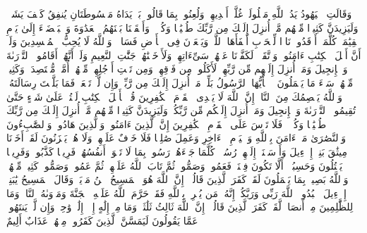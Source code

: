 وَقَالَتِ ٱلۡیَهُودُ یَدُ ٱللَّهِ مَغۡلُولَةٌۚ غُلَّتۡ أَیۡدِیهِمۡ وَلُعِنُوا۟ بِمَا قَالُوا۟ۘ بَلۡ یَدَاهُ مَبۡسُوطَتَانِ یُنفِقُ كَیۡفَ یَشَاۤءُۚ وَلَیَزِیدَنَّ كَثِیرࣰا مِّنۡهُم مَّاۤ أُنزِلَ إِلَیۡكَ مِن رَّبِّكَ طُغۡیَٰنࣰا وَكُفۡرࣰاۚ وَأَلۡقَیۡنَا بَیۡنَهُمُ ٱلۡعَدَٰوَةَ وَٱلۡبَغۡضَاۤءَ إِلَىٰ یَوۡمِ ٱلۡقِیَٰمَةِۚ كُلَّمَاۤ أَوۡقَدُوا۟ نَارࣰا لِّلۡحَرۡبِ أَطۡفَأَهَا ٱللَّهُۚ وَیَسۡعَوۡنَ فِی ٱلۡأَرۡضِ فَسَادࣰاۚ وَٱللَّهُ لَا یُحِبُّ ٱلۡمُفۡسِدِینَ%
\stopbuffer%
\startbuffer[\q:5:65]
وَلَوۡ أَنَّ أَهۡلَ ٱلۡكِتَٰبِ ءَامَنُوا۟ وَٱتَّقَوۡا۟ لَكَفَّرۡنَا عَنۡهُمۡ سَیِّءَاتِهِمۡ وَلَأَدۡخَلۡنَٰهُمۡ جَنَّٰتِ ٱلنَّعِیمِ%
\stopbuffer%
\startbuffer[\q:5:66]
وَلَوۡ أَنَّهُمۡ أَقَامُوا۟ ٱلتَّوۡرَىٰةَ وَٱلۡإِنجِیلَ وَمَاۤ أُنزِلَ إِلَیۡهِم مِّن رَّبِّهِمۡ لَأَكَلُوا۟ مِن فَوۡقِهِمۡ وَمِن تَحۡتِ أَرۡجُلِهِمۚ مِّنۡهُمۡ أُمَّةࣱ مُّقۡتَصِدَةࣱۖ وَكَثِیرࣱ مِّنۡهُمۡ سَاۤءَ مَا یَعۡمَلُونَ%
\stopbuffer%
\startbuffer[\q:5:67]
۞ یَٰۤأَیُّهَا ٱلرَّسُولُ بَلِّغۡ مَاۤ أُنزِلَ إِلَیۡكَ مِن رَّبِّكَۖ وَإِن لَّمۡ تَفۡعَلۡ فَمَا بَلَّغۡتَ رِسَالَتَهُۥۚ وَٱللَّهُ یَعۡصِمُكَ مِنَ ٱلنَّاسِۗ إِنَّ ٱللَّهَ لَا یَهۡدِی ٱلۡقَوۡمَ ٱلۡكَٰفِرِینَ%
\stopbuffer%
\startbuffer[\q:5:68]
قُلۡ یَٰۤأَهۡلَ ٱلۡكِتَٰبِ لَسۡتُمۡ عَلَىٰ شَیۡءٍ حَتَّىٰ تُقِیمُوا۟ ٱلتَّوۡرَىٰةَ وَٱلۡإِنجِیلَ وَمَاۤ أُنزِلَ إِلَیۡكُم مِّن رَّبِّكُمۡۗ وَلَیَزِیدَنَّ كَثِیرࣰا مِّنۡهُم مَّاۤ أُنزِلَ إِلَیۡكَ مِن رَّبِّكَ طُغۡیَٰنࣰا وَكُفۡرࣰاۖ فَلَا تَأۡسَ عَلَى ٱلۡقَوۡمِ ٱلۡكَٰفِرِینَ%
\stopbuffer%
\startbuffer[\q:5:69]
إِنَّ ٱلَّذِینَ ءَامَنُوا۟ وَٱلَّذِینَ هَادُوا۟ وَٱلصَّٰبِءُونَ وَٱلنَّصَٰرَىٰ مَنۡ ءَامَنَ بِٱللَّهِ وَٱلۡیَوۡمِ ٱلۡءَاخِرِ وَعَمِلَ صَٰلِحࣰا فَلَا خَوۡفٌ عَلَیۡهِمۡ وَلَا هُمۡ یَحۡزَنُونَ%
\stopbuffer%
\startbuffer[\q:5:70]
لَقَدۡ أَخَذۡنَا مِیثَٰقَ بَنِیۤ إِسۡرَٰۤءِیلَ وَأَرۡسَلۡنَاۤ إِلَیۡهِمۡ رُسُلࣰاۖ كُلَّمَا جَاۤءَهُمۡ رَسُولُۢ بِمَا لَا تَهۡوَىٰۤ أَنفُسُهُمۡ فَرِیقࣰا كَذَّبُوا۟ وَفَرِیقࣰا یَقۡتُلُونَ%
\stopbuffer%
\startbuffer[\q:5:71]
وَحَسِبُوۤا۟ أَلَّا تَكُونَ فِتۡنَةࣱ فَعَمُوا۟ وَصَمُّوا۟ ثُمَّ تَابَ ٱللَّهُ عَلَیۡهِمۡ ثُمَّ عَمُوا۟ وَصَمُّوا۟ كَثِیرࣱ مِّنۡهُمۡۚ وَٱللَّهُ بَصِیرُۢ بِمَا یَعۡمَلُونَ%
\stopbuffer%
\startbuffer[\q:5:72]
لَقَدۡ كَفَرَ ٱلَّذِینَ قَالُوۤا۟ إِنَّ ٱللَّهَ هُوَ ٱلۡمَسِیحُ ٱبۡنُ مَرۡیَمَۖ وَقَالَ ٱلۡمَسِیحُ یَٰبَنِیۤ إِسۡرَٰۤءِیلَ ٱعۡبُدُوا۟ ٱللَّهَ رَبِّی وَرَبَّكُمۡۖ إِنَّهُۥ مَن یُشۡرِكۡ بِٱللَّهِ فَقَدۡ حَرَّمَ ٱللَّهُ عَلَیۡهِ ٱلۡجَنَّةَ وَمَأۡوَىٰهُ ٱلنَّارُۖ وَمَا لِلظَّٰلِمِینَ مِنۡ أَنصَارࣲ%
\stopbuffer%
\startbuffer[\q:5:73]
لَّقَدۡ كَفَرَ ٱلَّذِینَ قَالُوۤا۟ إِنَّ ٱللَّهَ ثَالِثُ ثَلَٰثَةࣲۘ وَمَا مِنۡ إِلَٰهٍ إِلَّاۤ إِلَٰهࣱ وَٰحِدࣱۚ وَإِن لَّمۡ یَنتَهُوا۟ عَمَّا یَقُولُونَ لَیَمَسَّنَّ ٱلَّذِینَ كَفَرُوا۟ مِنۡهُمۡ عَذَابٌ أَلِیمٌ%
